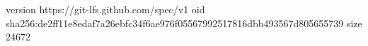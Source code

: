 version https://git-lfs.github.com/spec/v1
oid sha256:de2ff11e8edaf7a26ebfc34f6ae976f05567992517816dbb493567d805655739
size 24672
